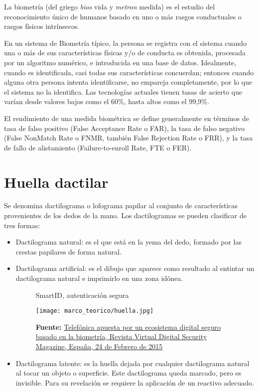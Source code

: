 \documentclass[../principal]{subfiles}
\begin{document}
  La biometría (del griego \emph{bios} vida y \emph{metron} medida) es el estudio del reconocimiento único de humanos basado en uno o más rasgos conductuales o rasgos físicos intrínsecos.\cite{libro:tecnologias_biometricas_aplicadas_seguridad}

  En un sistema de Biometría típico, la persona se registra con el sistema cuando una o más de sus características físicas y/o de conducta es obtenida, procesada por un algoritmo numérico, e introducida en una base de datos. Idealmente, cuando es identificada, casi todas sus características concuerdan; entonces cuando alguna otra persona intenta identificarse, no empareja completamente, por lo que el sistema no la identifica. Las tecnologías actuales tienen tasas de acierto que varían desde valores bajos como el 60\%, hasta altos como el 99,9\%.
  
  El rendimiento de una medida biométrica se define generalmente en términos de tasa de falso positivo (False Acceptance Rate o FAR), la tasa de falso negativo (False NonMatch Rate o FNMR, también False Rejection Rate o FRR), y la tasa de fallo de alistamiento (Failure-to-enroll Rate, FTE o FER).

  \section{Huella dactilar}

  Se denomina dactilograma o lofograma papilar al conjunto de características provenientes de los dedos de la mano. Los dactilogramas se pueden clasificar de tres formas:

  \begin{itemize}
    \setlength\itemsep{0.1em}
	  \item Dactilograma natural: es el que está en la yema del dedo, formado por las crestas papilares de forma natural.
	  \item Dactilograma artificial: es el dibujo que aparece como resultado al entintar un dactilograma natural e imprimirlo en una zona idónea.
    \begin{figure}[H]
      \centering
      \caption{SmartID, autenticación segura}
      \texttt{[image: marco\_teorico/huella.jpg]}
      \caption*{\textbf{Fuente:} \href{http://www.digitalsecuritymagazine.com/2015/02/24/telefonica-apuesta-por-un-ecosistema-digital-seguro-basado-en-la-biometria/}{Telefónica apuesta por un ecosistema digital seguro basado en la biometría, Revista Virtual Digital Security Magazine, España, 24 de Febrero de 2015}}
    \end{figure}
	  \item Dactilograma latente: es la huella dejada por cualquier dactilograma natural al tocar un objeto o superficie. Este dactilograma queda marcado, pero es invisible. Para su revelación se requiere la aplicación de un reactivo adecuado.\cite{articulo:identificacion_forense_comunidades_bacterias}
  \end{itemize}
\end{document}
